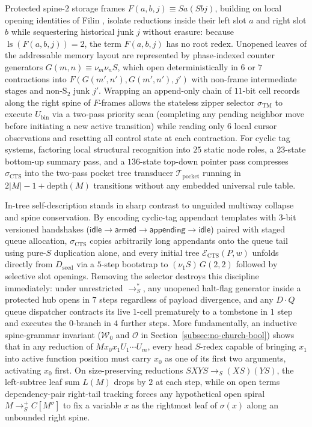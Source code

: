 \documentclass[11pt,reqno]{amsart}
\numberwithin{equation}{section}
\theoremstyle{plain}
\theoremstyle{definition}
\theoremstyle{remark}
\DeclareMathOperator{\ls}{ls}
\newcommand{\redS}{\to_S}
\newcommand{\redSp}{\to_S^+}
\newcommand{\redSs}{\to_S^*}
\begin{document}
Protected spine-$2$ storage frames $F(a,b,j) \equiv S a(S b j)$, building on local opening identities of Filin \cite{Filin2026}, isolate reductions inside their left slot $a$ and right slot $b$ while sequestering historical junk $j$ without erasure: because $\ls(F(a,b,j)) = 2$, the term $F(a,b,j)$ has no root redex. Unopened leaves of the addressable memory layout are represented by phase-indexed counter generators $G(m,n) \equiv \nu_m \nu_n S$, which open deterministically in $6$ or $7$ contractions into $F(G(m',n'), G(m',n'), j')$ with non-frame intermediate stages and non-$\mathrm{S}_2$ junk $j'$. Wrapping an append-only chain of $11$-bit cell records along the right spine of $F$-frames allows the stateless zipper selector $\sigma_{\mathrm{TM}}$ to execute $U_{\mathrm{bin}}$ via a two-pass priority scan (completing any pending neighbor move before initiating a new active transition) while reading only $6$ local cursor observations and resetting all control state at each contraction. For cyclic tag systems, factoring local structural recognition into $25$ static node roles, a $23$-state bottom-up summary pass, and a $136$-state top-down pointer pass compresses $\sigma_{\mathrm{CTS}}$ into the two-pass pocket tree transducer $\mathcal{T}_{\mathrm{pocket}}$ running in $2|M| - 1 + \mathrm{depth}(M)$ transitions without any embedded universal rule table.

In-tree self-description stands in sharp contrast to unguided multiway collapse and spine conservation. By encoding cyclic-tag appendant templates with $3$-bit versioned handshakes ($\mathsf{idle} \to \mathsf{armed} \to \mathsf{appending} \to \mathsf{idle}$) paired with staged queue allocation, $\sigma_{\mathrm{CTS}}$ copies arbitrarily long appendants onto the queue tail using pure-$S$ duplication alone, and every initial tree $\mathcal{E}_{\mathrm{CTS}}(P,w)$ unfolds directly from $D_{\mathrm{seed}}$ via a $5$-step bootstrap to $(\nu_1 S)\,G(2,2)$ followed by selective slot openings. Removing the selector destroys this discipline immediately: under unrestricted $\redSs$, any unopened halt-flag generator inside a protected hub opens in $7$ steps regardless of payload divergence, and any $D \cdot Q$ queue dispatcher contracts its live $1$-cell prematurely to a tombstone in $1$ step and executes the $0$-branch in $4$ further steps. More fundamentally, an inductive spine-grammar invariant ($\mathcal{W}_0$ and $\mathcal{O}$ in Section~\ref{subsec:no-church-bool}) shows that in any reduction of $M x_0 x_1 U_1 \cdots U_m$, every head $S$-redex capable of bringing $x_1$ into active function position must carry $x_0$ as one of its first two arguments, activating $x_0$ first. On size-preserving reductions $S X Y S \redS (X S)(Y S)$, the left-subtree leaf sum $L(M)$ drops by $2$ at each step, while on open terms dependency-pair right-tail tracking forces any hypothetical open spiral $M \redSp C[M^\sigma]$ to fix a variable $x$ as the rightmost leaf of $\sigma(x)$ along an unbounded right spine.
\end{document}
